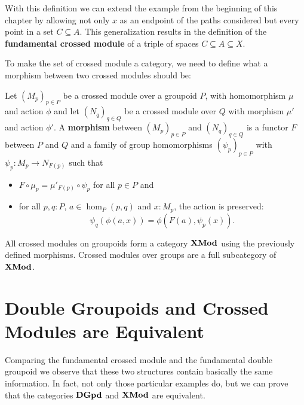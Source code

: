 With this definition we can extend the example from the beginning of this
chapter by allowing not only $x$ as an endpoint of the paths considered but every
point in a set $C \subseteq A$.
This generalization results in the definition of the \textbf{fundamental crossed
module} of a triple of spaces $C \subseteq A \subseteq X$.

To make the set of crossed module a category, we need to define what a morphism
between two crossed modules should be:

\begin{defn}
Let $(M_p)_{p \in P}$ be a crossed module over a groupoid $P$, with homomorphism
$\mu$ and action $\phi$ and let $(N_q)_{q \in Q}$ be a crossed module over $Q$
with morphism $\mu'$ and action $\phi'$.
A \textbf{morphism} between $(M_p)_{p \in P}$ and $(N_q)_{q \in Q}$ is a functor $F$
between $P$ and $Q$ and a family of group homomorphisms $(\psi_p)_{p \in P}$ 
with $\psi_p : M_p \to N_{F(p)}$ such that %
\begin{itemize}
\item $F \circ \mu_p = \mu'_{F(p)} \circ \psi_p$ for all $p \in P$ and
\item for all $p, q : P$, $a \in \hom_P(p,q)$ and $x : M_p$, the action is preserved:
\begin{equation*}
\psi_q(\phi(a,x)) = \phi(F(a),\psi_p(x)) \text{.} %
\end{equation*}
\end{itemize}
\end{defn}

\begin{defn}
All crossed modules on groupoids form a category $\mathbf{XMod}$ using the previously
defined morphisms. Crossed modules over groups are a full subcategory of $\mathbf{XMod}$.
\end{defn}

\section[DGpd and XMod are Equivalent]{Double Groupoids and Crossed Modules are Equivalent}

Comparing the fundamental crossed module and the fundamental double groupoid we
observe that these two structures contain basically the same information.
In fact, not only those particular examples do, but we can prove that the categories
$\mathbf{DGpd}$ and $\mathbf{XMod}$ are equivalent.

